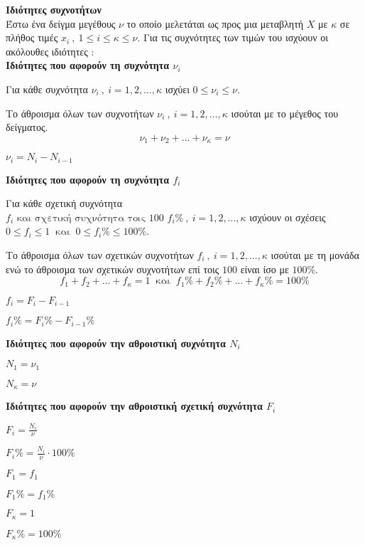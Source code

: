 \documentclass[twoside,nofonts,internet,math,spyros]{frontisthrio}
\newcommand{\ml}[1]{\setlength{\columnseprule}{#1pt}}
\begin{document}
\begin{arithmisi}
\item\textbf{Ιδιότητες συχνοτήτων}\\
Έστω ένα δείγμα μεγέθους $ \nu $ το οποίο μελετάται ως προς μια μεταβλητή $ X $ με $ \kappa $ σε πλήθος τιμές $ x_i\ ,\ 1\leq i\leq \kappa\leq\nu $. Για τις συχνότητες των τιμών του ισχύουν οι ακόλουθες ιδιότητες :\\
\textbf{Ιδιότητες που αφορούν τη συχνότητα $ \nu_i $}
\begin{rlist}
\item Για κάθε συχνότητα $ \nu_i\ ,\ i=1,2,\ldots,\kappa $ ισχύει $ 0\leq\nu_i\leq\nu $.
\item Το άθροισμα όλων των συχνοτήτων $ \nu_i\ ,\ i=1,2,\ldots,\kappa $ ισούται με το μέγεθος του δείγματος.
\[ \nu_1+\nu_2+\ldots+\nu_\kappa=\nu \]
\item $ \nu_i=N_i-N_{i-1} $
\end{rlist}
\textbf{Ιδιότητες που αφορούν τη συχνότητα $f_i$}
\begin{rlist}[resume]
\item Για κάθε σχετική συχνότητα $ f_i\textrm{ και σχετική συχνότητα τοις 100 }f_i\%\ ,\ i=1,2,\ldots,\kappa $ ισχύουν οι σχέσεις $ 0\leq f_i\leq 1\ \textrm{ και }\ 0\leq f_i\%\leq100\% $.
\item Το άθροισμα όλων των σχετικών συχνοτήτων $ f_i\ ,\ i=1,2,\ldots,\kappa $ ισούται με τη μονάδα ενώ το άθροισμα των σχετικών συχνοτήτων επί τοις $ 100 $ είναι ίσο με $ 100\% $.
\[ f_1+f_2+\ldots+f_\kappa=1\ \textrm{ και }\ f_1\%+f_2\%+\ldots+f_\kappa\%=100\% \]
\item $ f_i=F_i-F_{i-1} $
\item $ f_i\%=F_i\%-F_{i-1}\% $
\end{rlist}
\textbf{Ιδιότητες που αφορούν την αθροιστική συχνότητα $N_i$}
\begin{rlist}[resume]
\item $ N_1=\nu_1 $
\item $ N_\kappa=\nu $
\end{rlist}
\textbf{Ιδιότητες που αφορούν την αθροιστική σχετική συχνότητα $F_i$}
\ml{0}
\begin{rlist}[resume]
\begin{multicols}{3}
\item $ F_i=\frac{N_i}{\nu} $
\item $ F_i\%=\frac{N_i}{\nu}\cdot 100\% $
\item $ F_1=f_1 $
\item $ F_1\%=f_1\% $
\item $ F_\kappa=1 $
\item $ F_\kappa\%=100\% $
\end{multicols}
\end{rlist}
\end{arithmisi}
\ml{0.2}
\end{document}
